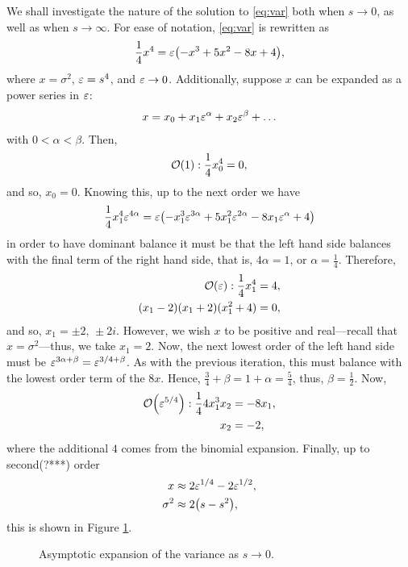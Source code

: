 We shall investigate the nature of the solution to \eqref{eq:var} both when $s \rightarrow 0$, as well as when $s \rightarrow \infty$. For ease of notation, \eqref{eq:var} is rewritten as
\begin{align*}
\frac{1}{4} x^4 = \eps \left( -x^3 + 5x^2 - 8x + 4 \right),
\end{align*}
where $x = \sigma^2$, $\varepsilon = s^4$, and $\varepsilon \rightarrow 0$. Additionally, suppose $x$ can be expanded as a power series in $\varepsilon$:
\begin{align*}
x = x_0 + x_1 \varepsilon^\alpha + x_2 \varepsilon^\beta + \dots
\end{align*}
with $0 < \alpha < \beta$. Then,
\begin{align*}
\bigO1 : \frac{1}{4} x_0^4 = 0,
\end{align*}
and so, $x_0 = 0$. Knowing this, up to the next order we have
\begin{align*}
\frac{1}{4} x_1^4 \eps^{4\alpha} = \eps \left( -x_1^3 \eps^{3\alpha} + 5x_1^2 \eps^{2\alpha} - 8x_1 \eps^\alpha + 4 \right)
\end{align*}
in order to have dominant balance it must be that the left hand side balances with the final term of the right hand side, that is, $4\alpha = 1$, or $\alpha = \frac{1}{4}$. Therefore,
\begin{align*}
\bigO\eps : \frac{1}{4} x_1^4 &= 4, \\
(x_1 - 2)(x_1 + 2)(x_1^2 + 4) &= 0,
\end{align*}
and so, $x_1 = \pm 2, \, \pm 2 i$. However, we wish $x$ to be positive and real---recall that $x = \sigma^2$---thus, we take $x_1 = 2$. Now, the next lowest order of the left hand side must be $\varepsilon^{3\alpha + \beta} = \varepsilon^{3/4 + \beta}$. As with the previous iteration, this must balance with the lowest order term of the $8x$. Hence, $\frac{3}{4} + \beta = 1 + \alpha = \frac{5}{4}$, thus, $\beta = \frac{1}{2}$. Now,
\begin{align*}
\bigO{\eps^{5/4}}: \frac{1}{4} 4 x_1^3 x_2 &= -8x_1, \\
x_2 &= -2,
\end{align*}
where the additional $4$ comes from the binomial expansion. Finally, up to second(?***) order
\begin{align*}
x &\approx 2 \eps^{1/4} - 2 \eps^{1/2}, \\
\sigma^2 &\approx 2 \left( s - s^2 \right),
\end{align*}
this is shown in Figure \ref{fig:lims0}.
\begin{figure}[tbp]

\caption{Asymptotic expansion of the variance as $s \rightarrow 0$.}
\label{fig:lims0}
\end{figure}


